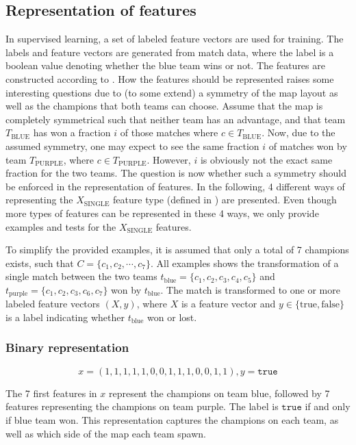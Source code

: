 \subsection{Representation of features}
\label{sec:representationoffeatures}
In supervised learning, a set of labeled feature vectors are used for training.
The labels and feature vectors are generated from match data, where the label is a boolean value denoting whether the blue team wins or not.
The features are constructed according to .
How the features should be represented raises some interesting questions due to (to some extend) a symmetry of the map layout as well as the champions that both teams can choose. Assume that the map is completely symmetrical such that neither team has an advantage, and that team $T_\text{BLUE}$ has won a fraction $i$ of those matches where $c \in T_\text{BLUE}$.
Now, due to the assumed symmetry, one may expect to see the same fraction $i$ of matches won by team $T_\text{PURPLE}$, where $c \in T_\text{PURPLE}$.
However, $i$ is obviously not the exact same fraction for the two teams. The question is now whether such a symmetry should be enforced in the representation of features.
In the following, 4 different ways of representing the $X_\text{SINGLE}$ feature type (defined in ) are presented.
Even though more types of features can be represented in these 4 ways, we only provide examples and tests for the $X_\text{SINGLE}$ features.

To simplify the provided examples, it is assumed that only a total of 7 champions exists, such that $C = \{c_1, c_2, \cdots, c_7\}$.
All examples shows the transformation of a single match between the two teams $t_\text{blue} = \{c_1,c_2,c_3,c_4,c_5\}$ and $t_\text{purple} = \{c_1,c_2,c_3,c_6,c_7\}$ won by $t_\text{blue}$. The match is transformed to one or more labeled feature vectors $(X, y)$, where $X$ is a feature vector and $y \in \{\text{true}, \text{false}\}$ is a label indicating whether $t_\text{blue}$ won or lost.

\subsubsection{Binary representation}

\[ x = (1,1,1,1,1,0,0,1,1,1,0,0,1,1), y = \texttt{true} \]

The 7 first features in $x$ represent the champions on team blue, followed by 7 features representing the champions on team purple. The label is $\texttt{true}$ if and only if blue team won.
This representation captures the champions on each team, as well as which side of the map each team spawn.

